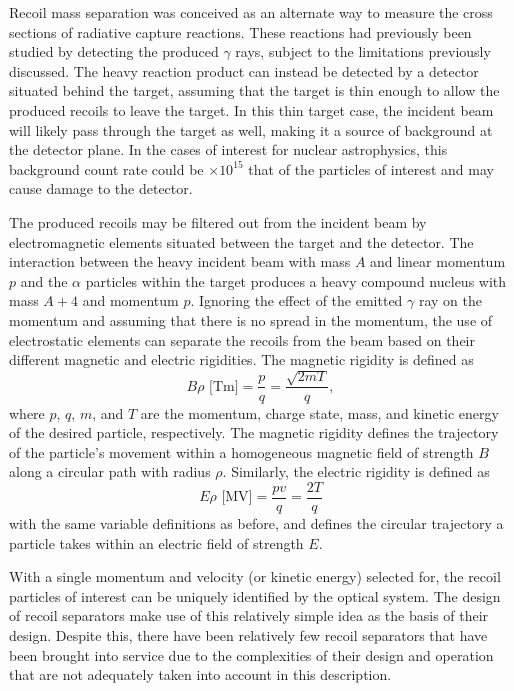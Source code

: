 Recoil mass separation was conceived as an alternate way to measure the cross
sections of radiative capture reactions. These reactions had previously been
studied by detecting the produced $\gamma$ rays, subject to the limitations
previously discussed. The heavy reaction product can instead be detected by a
detector situated behind the target, assuming that the target is thin enough to
allow the produced recoils to leave the target. In this thin target case, the
incident beam will likely pass through the target as well, making it a source
of background at the detector plane. In the cases of interest for nuclear
astrophysics, this background count rate could be $\times 10^{15}$ that of the
particles of interest and may cause damage to the detector.

The produced recoils may be filtered out from the incident beam by
electromagnetic elements situated between the target and the detector. The
interaction between the heavy incident beam with mass $A$ and linear momentum
$p$ and the $\alpha$ particles within
the target produces a heavy compound nucleus with mass $A + 4$ and momentum
$p$. Ignoring the effect of the emitted $\gamma$ ray on the momentum and
assuming that there is no spread in the momentum, the use of electrostatic
elements can separate the recoils from the beam based on their different
magnetic and electric rigidities. The magnetic rigidity is defined as
\begin{equation}
    \label{eq:brho}
    B\rho\textrm{ [Tm]} = \frac{p}{q} = \frac{\sqrt{2mT}}{q},
\end{equation}
where $p$, $q$, $m$, and $T$ are the momentum, charge state, mass, and kinetic
energy of the desired particle, respectively. The magnetic rigidity
defines the trajectory of the particle's movement within a homogeneous magnetic
field of strength $B$ along a circular path with radius $\rho$. Similarly, the
electric rigidity is defined as
\begin{equation}
    \label{eq:erho}
    E\rho\textrm{ [MV]} = \frac{pv}{q} = \frac{2T}{q}
\end{equation}
with the same variable definitions as before, and defines the circular
trajectory a particle takes within an electric field of strength $E$.

With a single momentum and
velocity (or kinetic energy) selected for, the recoil particles of interest can
be uniquely identified by the optical system. The design of recoil separators
make use of this relatively simple idea as the basis of their design. Despite
this, there have been relatively few recoil separators that have been brought
into service due to the complexities of their design and operation that are not
adequately taken into account in this description.

